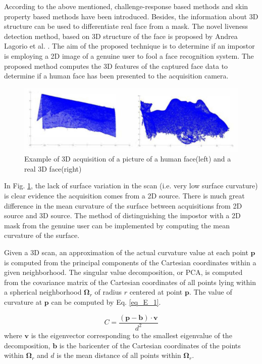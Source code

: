 \documentclass[journal]{IEEEtran}
\begin{document}
According to the above mentioned, challenge-response based methods and skin property based methods have been introduced. Besides, the information about 3D structure can be used to differentiate real face from a mask. The novel liveness detection method, based on 3D structure of the face is proposed by Andrea Lagorio et al. \cite{lagorio2013liveness}. The aim of the proposed technique is to determine if an impostor is employing a 2D image of a genuine user to fool a face recognition system. The proposed method computes the 3D features of the captured face data to determine if a human face has been presented to the acquisition camera.

\begin{figure}[!t]
\centering
\includegraphics[width=1\linewidth]{img/E_1}
\caption{Example of 3D acquisition of a picture of a human face(left) and a real 3D face(right)}
\label{fig_E_1}
\end{figure}

In Fig. \ref{fig_E_1}, the lack of surface variation in the scan (i.e. very low surface curvature) is clear evidence the acquisition comes from a 2D source. There is much great difference in the mean curvature of the surface between acquisitions from 2D source and 3D source. The method of distinguishing the impostor with a 2D mask from the genuine user can be implemented by computing the mean curvature of the surface.

Given a 3D scan, an approximation of the actual curvature value at each point $\mathbf{p}$ is computed from the principal components of the Cartesian coordinates within a given neighborhood. The singular value decomposition, or PCA, is computed from the covariance matrix of the Cartesian coordinates of all points lying within a spherical neighborhood $\mathbf{\Omega}_r$ of radius $r$ centered at point $\mathbf{p}$. The value of curvature at $\mathbf{p}$ can be computed by Eq. \ref{eq_E_1}.  

\begin{equation}
\label{eq_E_1}
C = \frac{\mathbf{(p-b)\cdot v}}{d^2}
\end{equation}
where $\mathbf{v}$ is the eigenvector corresponding to the smallest eigenvalue of the decomposition, $\mathbf{b}$ is the baricenter of the Cartesian coordinates of the points within $\mathbf{\Omega}_r$ and $d$ is the mean distance of all points within $\mathbf{\Omega}_r$.
\end{document}
